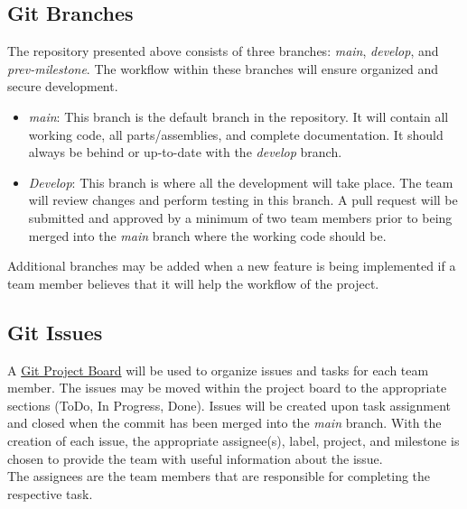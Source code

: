 \documentclass{article}
\begin{document}
	\subsection{Git Branches}
	The repository presented above consists of three branches: \emph{main}, \emph{develop}, and \emph{prev-milestone}. 
	The workflow within these branches will ensure organized and secure development.
	\begin{itemize}
		\item \emph{main}: This branch is the default branch in the repository. It will contain all working code, all parts/assemblies, and complete documentation. 
		It should always be behind or up-to-date with the \emph{develop} branch.
		\item \emph{Develop}: This branch is where all the development will take place.
		 The team will review changes and perform testing in this branch. A pull request 
		 will be submitted and approved by a minimum of two team members prior to being 
		 merged into the \emph{main} branch where the working code should be.
	\end{itemize}
	Additional branches may be added when a new feature is being implemented if a 
	team member believes that it will help the workflow of the project.

	\subsection{Git Issues}
	A \href{https://github.com/users/aaronbilly22/projects/1}{Git Project Board} will be used to organize 
	issues and tasks for each team member. The issues may be moved within the project board to the 
	appropriate sections (ToDo, In Progress, Done). Issues will be created upon task assignment and closed 
	when the commit has been merged into the \emph{main} branch. With the creation of each issue, the appropriate assignee(s), label, project, and milestone is chosen
	to provide the team with useful information about the issue.\\

	\noindent The assignees are the team members that are responsible for completing the respective task.\\
\end{document}
